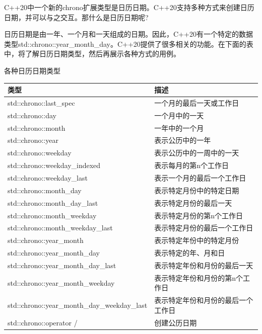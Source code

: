 
C++20中一个新的chrono扩展类型是日历日期。C++20支持多种方式来创建日历日期，并可以与之交互。那什么是日历日期呢?

日历日期是由一年、一个月和一天组成的日期。因此，C++20有一个特定的数据类型std::chrono::year\_month\_day。C++20提供了很多相关的功能。在下面的表中，将了解日历日期类型，然后再展示各种方式的用例。

\begin{center}
各种日历日期类型
\end{center}

\begin{table}[H]
\centering
\begin{tabular}{ll}
\textbf{类型}                 & \textbf{描述}                                   \\ \hline
std::chrono::last\_spec       & 一个月的最后一天或工作日           \\
std::chrono::day              & 一个月中的一天                            \\
std::chrono::month            & 一年中的一个月                           \\
std::chrono::year             & 表示公历中的一年            \\
std::chrono::weekday          & 表示公历中的一周中的一天 \\
std::chrono::weekday\_indexed & 表示每月的第n个工作日                 \\
std::chrono::weekday\_last    & 表示一个月的最后一个工作日                 \\
std::chrono::month\_day       & 表示特定月份中的特定日期          \\
std::chrono::month\_day\_last & 表示特定月份的最后一天            \\
std::chrono::month\_weekday   & 表示特定月份的第n个工作日        \\
std::chrono::month\_weekday\_last            & 表示特定月份的最后一个工作日           \\
std::chrono::year\_month      & 表示特定年份中的特定月份         \\
std::chrono::year\_month\_day & 表示特定的年、月和日             \\
std::chrono::year\_month\_day\_last          & 表示特定年份和月份的最后一天      \\
std::chrono::year\_month\_weekday            & 表示特定年份和月份的第n个工作日  \\
std::chrono::year\_month\_day\_weekday\_last & 表示特定年份和月份的最后一个工作日 \\
std::chrono::operator /       & 创建公历日期              
\end{tabular}
\end{table}

